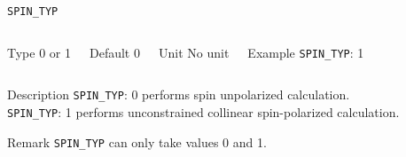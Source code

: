 \documentclass[xcolor=dvipsnames,t]{beamer}
\begin{document}
\begin{frame}[allowframebreaks]{\texttt{SPIN\_TYP}} \label{SPIN_TYP}
\vspace*{-12pt}
\begin{columns}
\begin{block}{Type}
0 or 1
\end{block}

\begin{block}{Default}
0
\end{block}

\begin{block}{Unit}
No unit
\end{block}

\begin{block}{Example}
\texttt{SPIN\_TYP}: 1
\end{block}
\end{columns}

\begin{block}{Description}
\texttt{SPIN\_TYP}: 0 performs spin unpolarized calculation. \\
\texttt{SPIN\_TYP}: 1 performs unconstrained collinear spin-polarized calculation.   
\end{block}

\begin{block}{Remark}
\texttt{SPIN\_TYP} can only take values 0 and 1.
\end{block}

\end{frame}
\end{document}
